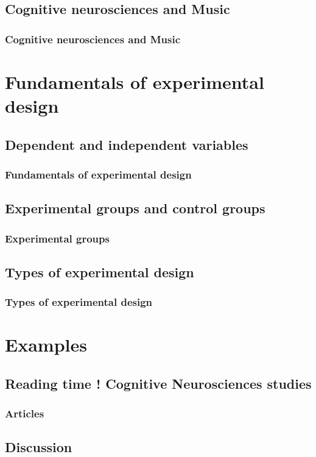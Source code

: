 \documentclass[xcolor=dvipsnames,english]{beamer}
\begin{document}
\subsection{Cognitive neurosciences and Music}

\begin{frame}
  \frametitle{Cognitive neurosciences and Music}
\end{frame}

\section{Fundamentals of experimental design}
\subsection{Dependent and independent variables}

\begin{frame}
  \frametitle{Fundamentals of experimental design}
\end{frame}

\subsection{Experimental groups and control groups}

\begin{frame}
  \frametitle{Experimental groups}
\end{frame}

\subsection{Types of experimental design}

\begin{frame}
  \frametitle{Types of experimental design}
\end{frame}

\section{Examples}
\subsection{Reading time ! Cognitive Neurosciences studies}

\begin{frame}
  \frametitle{Articles}
\end{frame}

\subsection{Discussion}
\end{document}

